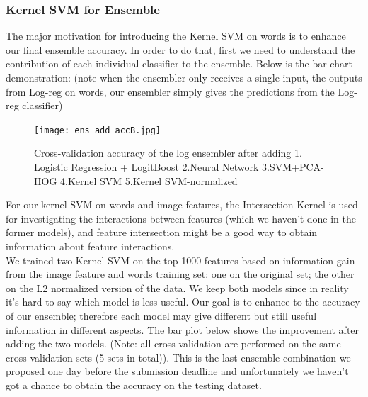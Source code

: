 \subsubsection{Kernel SVM for Ensemble}
\label{kernelsvmensemble}
The major motivation for introducing the Kernel SVM on words is to enhance our final ensemble accuracy. In order to do that, first we need to understand the contribution of each individual classifier to the ensemble. Below is the bar chart demonstration: (note when the ensembler only receives a single input, the outputs from Log-reg on words, our ensembler simply gives the predictions from the Log-reg classifier)\\
\begin{figure}
\texttt{[image: ens\_add\_accB.jpg]}
\caption{Cross-validation accuracy of the log ensembler after adding 1. Logistic Regression + LogitBoost 2.Neural Network 3.SVM+PCA-HOG 4.Kernel SVM 5.Kernel SVM-normalized}
\label{finalmodels}
\end{figure}
\noindent For our kernel SVM on words and image features, the Intersection Kernel is used for investigating the interactions between features (which we haven't done in the former models), and feature intersection might be a good way to obtain information about feature interactions.\\
We trained two Kernel-SVM on the top 1000  features based on information gain from the image feature and words training set: one on the original set; the other on the L2 normalized version of the data. We keep both models since in reality it's hard to say which model is less useful. Our goal is to enhance to the accuracy of our ensemble; therefore each model may give different but still useful information in different aspects. The bar plot below shows the improvement after adding the two models. (Note: all cross validation are performed on the same cross validation sets (5 sets in total)). This is the last ensemble combination we proposed one day before the submission deadline and unfortunately we haven't got a chance to obtain the accuracy on the testing dataset.\\

